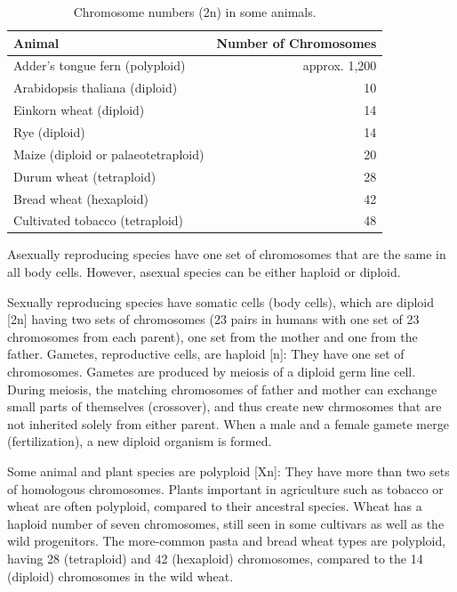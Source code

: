 \begin{table}[!h]

\caption{\label{tab:numanimals}Chromosome numbers (2n) in some animals.}
\centering
\begin{tabular}[t]{lr}
\toprule
Animal & Number of Chromosomes\\
\midrule
\rowcolor{gray!6}  Adder's tongue fern (polyploid) & approx. 1,200\\
Arabidopsis thaliana (diploid) & 10\\
\rowcolor{gray!6}  Einkorn wheat (diploid) & 14\\
Rye (diploid) & 14\\
\rowcolor{gray!6}  Maize (diploid or palaeotetraploid) & 20\\
\addlinespace
Durum wheat (tetraploid) & 28\\
\rowcolor{gray!6}  Bread wheat (hexaploid) & 42\\
Cultivated tobacco (tetraploid) & 48\\
\bottomrule
\end{tabular}
\end{table}

Asexually reproducing species have one set of chromosomes that are the same in all body cells. However, asexual species can be either haploid or diploid.

Sexually reproducing species have somatic cells (body cells), which are diploid {[}2n{]} having two sets of chromosomes (23 pairs in humans with one set of 23 chromosomes from each parent), one set from the mother and one from the father. Gametes, reproductive cells, are haploid {[}n{]}: They have one set of chromosomes. Gametes are produced by meiosis of a diploid germ line cell. During meiosis, the matching chromosomes of father and mother can exchange small parts of themselves (crossover), and thus create new chrmosomes that are not inherited solely from either parent. When a male and a female gamete merge (fertilization), a new diploid organism is formed.

Some animal and plant species are polyploid {[}Xn{]}: They have more than two sets of homologous chromosomes. Plants important in agriculture such as tobacco or wheat are often polyploid, compared to their ancestral species. Wheat has a haploid number of seven chromosomes, still seen in some cultivars as well as the wild progenitors. The more-common pasta and bread wheat types are polyploid, having 28 (tetraploid) and 42 (hexaploid) chromosomes, compared to the 14 (diploid) chromosomes in the wild wheat.

